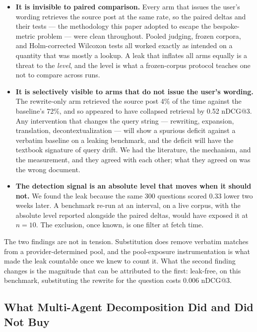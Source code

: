 \documentclass[acmsmall,review,anonymous,screen]{acmart}
\begin{document}
\begin{itemize}
  \item \textbf{It is invisible to paired comparison.} Every arm that issues
  the user's wording retrieves the source post at the same rate, so the paired
  deltas and their tests --- the methodology this paper adopted to escape the
  bespoke-metric problem --- were clean throughout. Pooled judging, frozen
  corpora, and Holm-corrected Wilcoxon tests all worked exactly as intended on
  a quantity that was mostly a lookup. A leak that inflates all arms equally is
  a threat to the \emph{level}, and the level is what a frozen-corpus protocol
  teaches one not to compare across runs.

  \item \textbf{It is selectively visible to arms that do not issue the user's
  wording.} The rewrite-only arm retrieved the source post 4\% of the time
  against the baseline's 72\%, and so appeared to have collapsed retrieval by
  0.52 nDCG@3. Any intervention that changes the query string --- rewriting,
  expansion, translation, decontextualization --- will show a spurious deficit
  against a verbatim baseline on a leaking benchmark, and the deficit will have
  the textbook signature of query drift. We had the literature, the mechanism,
  and the measurement, and they agreed with each other; what they agreed on was
  the wrong document.

  \item \textbf{The detection signal is an absolute level that moves when it
  should not.} We found the leak because the same 300 questions scored 0.33
  lower two weeks later. A benchmark re-run at an interval, on a live corpus,
  with the absolute level reported alongside the paired deltas, would have
  exposed it at $n=10$. The exclusion, once known, is one filter at fetch time.
\end{itemize}

The two findings are not in tension. Substitution does remove verbatim matches
from a provider-determined pool, and the pool-exposure instrumentation is what
made the leak countable once we knew to count it. What the second finding
changes is the magnitude that can be attributed to the first: leak-free, on this
benchmark, substituting the rewrite for the question costs 0.006 nDCG@3.

\subsection{What Multi-Agent Decomposition Did and Did Not Buy}
\label{sec:decomposition}
\end{document}
